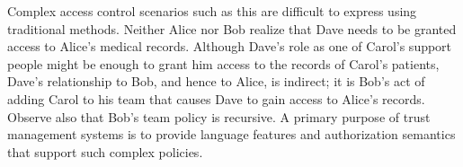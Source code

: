Complex access control scenarios such as this are difficult to express
using traditional methods. Neither Alice nor Bob realize that Dave
needs to be granted access to Alice's medical records. Although Dave's
role as one of Carol's support people might be enough to grant him
access to the records of Carol's patients, Dave's relationship to Bob,
and hence to Alice, is indirect; it is Bob's act of adding Carol to
his team that causes Dave to gain access to Alice's records.  Observe
also that Bob's team policy is recursive.  A primary purpose of trust
management systems is to provide language features and authorization
semantics that support such complex policies.


